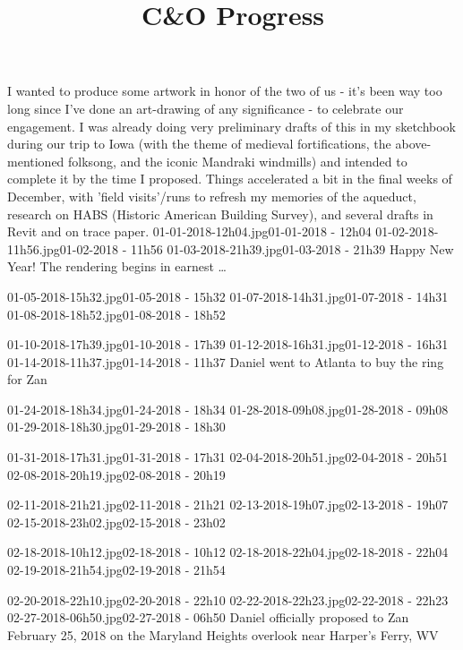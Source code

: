 ﻿\documentclass[letterpaper, 12pt, landscape]{ProgressBook}
\title{C\&O Progress}
\begin{document}
\fancyhead{} %


{I wanted to produce some artwork in honor of the two of us - it's been way too long since I've done an art-drawing of any significance - to celebrate our engagement. I was already doing very preliminary drafts of this in my sketchbook during our trip to Iowa (with the theme of medieval fortifications, the above-mentioned folksong, and the iconic Mandraki windmills) and intended to complete it by the time I proposed. Things accelerated a bit in the final weeks of December, with 'field visits'/runs to refresh my memories of the aqueduct, research on HABS (Historic American Building Survey), and several drafts in Revit and on trace paper. }
{01-01-2018-12h04.jpg}{01-01-2018 - 12h04}
{01-02-2018-11h56.jpg}{01-02-2018 - 11h56}
{01-03-2018-21h39.jpg}{01-03-2018 - 21h39}
{Happy New Year! The rendering begins in earnest \ldots}

{01-05-2018-15h32.jpg}{01-05-2018 - 15h32}
{01-07-2018-14h31.jpg}{01-07-2018 - 14h31}
{01-08-2018-18h52.jpg}{01-08-2018 - 18h52}

{01-10-2018-17h39.jpg}{01-10-2018 - 17h39}
{01-12-2018-16h31.jpg}{01-12-2018 - 16h31}
{01-14-2018-11h37.jpg}{01-14-2018 - 11h37}
{Daniel went to Atlanta to buy the ring for Zan}

{01-24-2018-18h34.jpg}{01-24-2018 - 18h34}
{01-28-2018-09h08.jpg}{01-28-2018 - 09h08}
{01-29-2018-18h30.jpg}{01-29-2018 - 18h30}

{01-31-2018-17h31.jpg}{01-31-2018 - 17h31}
{02-04-2018-20h51.jpg}{02-04-2018 - 20h51}
{02-08-2018-20h19.jpg}{02-08-2018 - 20h19}

{02-11-2018-21h21.jpg}{02-11-2018 - 21h21}
{02-13-2018-19h07.jpg}{02-13-2018 - 19h07}
{02-15-2018-23h02.jpg}{02-15-2018 - 23h02}

{02-18-2018-10h12.jpg}{02-18-2018 - 10h12}
{02-18-2018-22h04.jpg}{02-18-2018 - 22h04}
{02-19-2018-21h54.jpg}{02-19-2018 - 21h54}

{02-20-2018-22h10.jpg}{02-20-2018 - 22h10}
{02-22-2018-22h23.jpg}{02-22-2018 - 22h23}
{02-27-2018-06h50.jpg}{02-27-2018 - 06h50}
{Daniel officially proposed to Zan February 25, 2018 on the Maryland Heights overlook near Harper's Ferry, WV }
\end{document}
